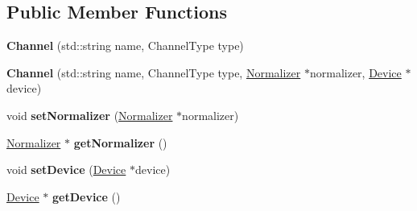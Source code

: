 \subsection*{Public Member Functions}
\begin{DoxyCompactItemize}
\item 
\hypertarget{classdrobot_1_1device_1_1channel_1_1Channel_a6fdb874d6679679e8b13cbcb94ab262c}{{\bfseries Channel} (std\-::string name, Channel\-Type type)}\label{classdrobot_1_1device_1_1channel_1_1Channel_a6fdb874d6679679e8b13cbcb94ab262c}

\item 
\hypertarget{classdrobot_1_1device_1_1channel_1_1Channel_ae86d5f4f5b0ad0438f1394fd433e6654}{{\bfseries Channel} (std\-::string name, Channel\-Type type, \hyperlink{classdrobot_1_1device_1_1channel_1_1Normalizer}{Normalizer} $\ast$normalizer, \hyperlink{classdrobot_1_1device_1_1Device}{Device} $\ast$device)}\label{classdrobot_1_1device_1_1channel_1_1Channel_ae86d5f4f5b0ad0438f1394fd433e6654}

\item 
\hypertarget{classdrobot_1_1device_1_1channel_1_1Channel_a86d35d028e0168f8058273ea28d71674}{void {\bfseries set\-Normalizer} (\hyperlink{classdrobot_1_1device_1_1channel_1_1Normalizer}{Normalizer} $\ast$normalizer)}\label{classdrobot_1_1device_1_1channel_1_1Channel_a86d35d028e0168f8058273ea28d71674}

\item 
\hypertarget{classdrobot_1_1device_1_1channel_1_1Channel_a2112fb19fbc17cc0b92188b84475c751}{\hyperlink{classdrobot_1_1device_1_1channel_1_1Normalizer}{Normalizer} $\ast$ {\bfseries get\-Normalizer} ()}\label{classdrobot_1_1device_1_1channel_1_1Channel_a2112fb19fbc17cc0b92188b84475c751}

\item 
\hypertarget{classdrobot_1_1device_1_1channel_1_1Channel_aae85170a5e749e6df36386a314132493}{void {\bfseries set\-Device} (\hyperlink{classdrobot_1_1device_1_1Device}{Device} $\ast$device)}\label{classdrobot_1_1device_1_1channel_1_1Channel_aae85170a5e749e6df36386a314132493}

\item 
\hypertarget{classdrobot_1_1device_1_1channel_1_1Channel_adc698d8fcdb9d571568f3958f865f514}{\hyperlink{classdrobot_1_1device_1_1Device}{Device} $\ast$ {\bfseries get\-Device} ()}\label{classdrobot_1_1device_1_1channel_1_1Channel_adc698d8fcdb9d571568f3958f865f514}


\end{DoxyCompactItemize}
